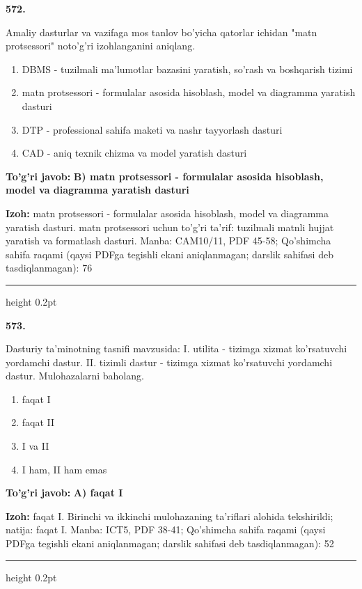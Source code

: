 \documentclass[10pt,a4paper]{article}
\begin{document}
{\bfseries\sffamily\color{ink} 572.}
\par
Amaliy dasturlar va vazifaga mos tanlov bo'yicha qatorlar ichidan "matn protsessori" noto'g'ri izohlanganini aniqlang.
\begin{enumerate}[label=\Alph*),leftmargin=9mm]
\item DBMS - tuzilmali ma'lumotlar bazasini yaratish, so'rash va boshqarish tizimi
\item matn protsessori - formulalar asosida hisoblash, model va diagramma yaratish dasturi
\item DTP - professional sahifa maketi va nashr tayyorlash dasturi
\item CAD - aniq texnik chizma va model yaratish dasturi
\end{enumerate}
\begin{tcolorbox}[enhanced,breakable,colback=teal!4,colframe=teal!60!black,boxrule=0.45pt,arc=1.2mm,left=2.7mm,right=2.7mm,top=1.8mm,bottom=1.8mm,before skip=2mm,after skip=2mm]
{\bfseries\sffamily\color{teal}To'g'ri javob:} \textbf{B) matn protsessori - formulalar asosida hisoblash, model va diagramma yaratish dasturi}
\par\smallskip
{\bfseries Izoh:} matn protsessori - formulalar asosida hisoblash, model va diagramma yaratish dasturi. matn protsessori uchun to'g'ri ta'rif: tuzilmali matnli hujjat yaratish va formatlash dasturi. Manba: CAM10/11, PDF 45-58; Qo'shimcha sahifa raqami (qaysi PDFga tegishli ekani aniqlanmagan; darslik sahifasi deb tasdiqlanmagan): 76
\end{tcolorbox}
\vspace{2mm}\hrule height 0.2pt\vspace{3mm}

{\bfseries\sffamily\color{ink} 573.}
\par
Dasturiy ta'minotning tasnifi mavzusida: I. utilita - tizimga xizmat ko'rsatuvchi yordamchi dastur. II. tizimli dastur - tizimga xizmat ko'rsatuvchi yordamchi dastur. Mulohazalarni baholang.
\begin{enumerate}[label=\Alph*),leftmargin=9mm]
\item faqat I
\item faqat II
\item I va II
\item I ham, II ham emas
\end{enumerate}
\begin{tcolorbox}[enhanced,breakable,colback=teal!4,colframe=teal!60!black,boxrule=0.45pt,arc=1.2mm,left=2.7mm,right=2.7mm,top=1.8mm,bottom=1.8mm,before skip=2mm,after skip=2mm]
{\bfseries\sffamily\color{teal}To'g'ri javob:} \textbf{A) faqat I}
\par\smallskip
{\bfseries Izoh:} faqat I. Birinchi va ikkinchi mulohazaning ta'riflari alohida tekshirildi; natija: faqat I. Manba: ICT5, PDF 38-41; Qo'shimcha sahifa raqami (qaysi PDFga tegishli ekani aniqlanmagan; darslik sahifasi deb tasdiqlanmagan): 52
\end{tcolorbox}
\vspace{2mm}\hrule height 0.2pt\vspace{3mm}
\end{document}
